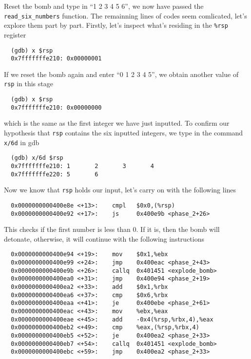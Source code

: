 Reset the bomb and type in ``1 2 3 4 5 6'', we now have passed the \verb+read_six_numbers+ function. The remainning lines of codes seem comlicated, let's explore them part by part. Firstly, let's inspect what's residing in the \verb+%rsp+ register
\begin{verbatim}
  (gdb) x $rsp
  0x7fffffffe210: 0x00000001
\end{verbatim}
If we reset the bomb again and enter ``0 1 2 3 4 5'', we obtain another value of \verb+rsp+ in this stage
\begin{verbatim}
  (gdb) x $rsp
  0x7fffffffe210: 0x00000000
\end{verbatim}
which is the same as the first integer we have just inputted. To confirm our hypothesis that \verb+rsp+ contains the six inputted integers, we type in the command \verb+x/6d+ in gdb
\begin{verbatim}
  (gdb) x/6d $rsp
  0x7fffffffe210: 1       2       3       4
  0x7fffffffe220: 5       6
\end{verbatim}
Now we know that \verb+rsp+ holds our input, let's carry on with the following lines
{\renewcommand\fcolorbox[4][]{\textcolor{cyan}{\strut#4}}
\begin{verbatim}
  0x0000000000400e8e <+13>:    cmpl   $0x0,(%rsp)
  0x0000000000400e92 <+17>:    js     0x400e9b <phase_2+26>  
\end{verbatim}
}\noindent
This checks if the first number is less than $0$. If it is, then the bomb will detonate, otherwise, it will continue with the following instructions
{\renewcommand\fcolorbox[4][]{\textcolor{cyan}{\strut#4}}
\begin{verbatim}
  0x0000000000400e94 <+19>:    mov    $0x1,%ebx
  0x0000000000400e99 <+24>:    jmp    0x400eac <phase_2+43>
  0x0000000000400e9b <+26>:    callq  0x401451 <explode_bomb>
  0x0000000000400ea0 <+31>:    jmp    0x400e94 <phase_2+19>
  0x0000000000400ea2 <+33>:    add    $0x1,%rbx
  0x0000000000400ea6 <+37>:    cmp    $0x6,%rbx
  0x0000000000400eaa <+41>:    je     0x400ebe <phase_2+61>
  0x0000000000400eac <+43>:    mov    %ebx,%eax
  0x0000000000400eae <+45>:    add    -0x4(%rsp,%rbx,4),%eax
  0x0000000000400eb2 <+49>:    cmp    %eax,(%rsp,%rbx,4)
  0x0000000000400eb5 <+52>:    je     0x400ea2 <phase_2+33>
  0x0000000000400eb7 <+54>:    callq  0x401451 <explode_bomb>
  0x0000000000400ebc <+59>:    jmp    0x400ea2 <phase_2+33>
\end{verbatim}
}
